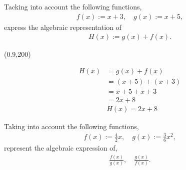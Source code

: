 \begin{preguntas}

\pregunta[12] Tacking into account the following functions, 
\begin{gather*}
    f(x):=x+3,\quad g(x):=x+5,
\end{gather*}
express the algebraic representation of 
\begin{gather*}
    H(x):= g(x) + f(x).
\end{gather*}

\begin{center}
    \framebox(0.9\textwidth,200){
    \begin{minipage}{\textwidth}
    \begin{align*}
        H(x) &= g(x) + f(x) \\
        &= (x+5) + (x+3) \\
        &= x+5 + x+3 \\
        &= 2x+8 \\
        &\boxed{H(x) = 2x+8}
    \end{align*}
    \end{minipage}
    }
\end{center}

\pregunta[12] Taking into account the following functions,
\begin{gather*}
    f(x):=\frac{4}{2}x,\quad g(x):=\frac{3}{6}x^2,
\end{gather*}
represent the algebraic expression of,
\begin{gather*}
    \frac{f(x)}{g(x)},\quad \frac{g(x)}{f(x)}.
\end{gather*}


\end{preguntas}
